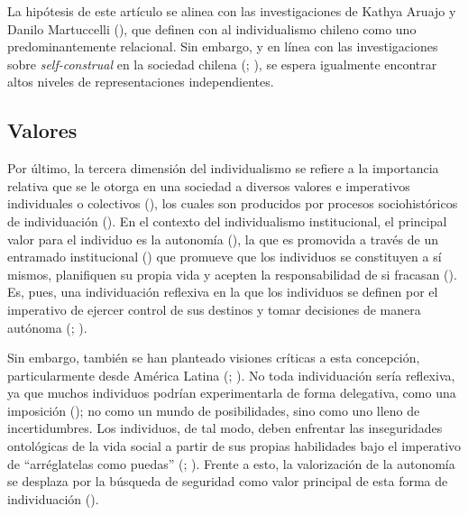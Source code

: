 \documentclass[
  12pt,
  letterpaper,
  DIV=11,
  numbers=noendperiod]{scrartcl}
\begin{document}
La hipótesis de este artículo se alinea con las investigaciones de
Kathya Aruajo y Danilo Martuccelli (),
que definen con al individualismo chileno como uno predominantemente
relacional. Sin embargo, y en línea con las investigaciones sobre
\emph{self-construal} en la sociedad chilena
(;
), se espera
igualmente encontrar altos niveles de representaciones independientes.

\subsection{Valores}\label{valores}

Por último, la tercera dimensión del individualismo se refiere a la
importancia relativa que se le otorga en una sociedad a diversos valores
e imperativos individuales o colectivos
(), los cuales son
producidos por procesos sociohistóricos de individuación
(). En el contexto del
individualismo institucional, el principal valor para el individuo es la
autonomía (), la que es
promovida a través de un entramado institucional
() que promueve que los
individuos se constituyen a sí mismos, planifiquen su propia vida y
acepten la responsabilidad de si fracasan
(). Es, pues, una individuación
reflexiva en la que los individuos se definen por el imperativo de
ejercer control de sus destinos y tomar decisiones de manera autónoma
(;
).

Sin embargo, también se han planteado visiones críticas a esta
concepción, particularmente desde América Latina
(;
). No toda individuación sería
reflexiva, ya que muchos individuos podrían experimentarla de forma
delegativa, como una imposición (); no como un mundo de posibilidades, sino como uno lleno
de incertidumbres. Los individuos, de tal modo, deben enfrentar las
inseguridades ontológicas de la vida social a partir de sus propias
habilidades bajo el imperativo de ``arréglatelas como puedas''
(;
). Frente a esto, la valorización
de la autonomía se desplaza por la búsqueda de seguridad como valor
principal de esta forma de individuación
().
\end{document}
